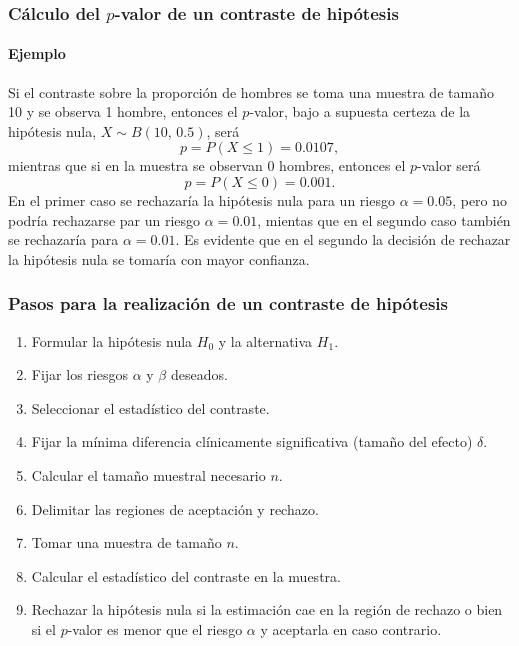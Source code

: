 \begin{frame}
\frametitle{Cálculo del $p$-valor de un contraste de hipótesis}
\framesubtitle{Ejemplo}
Si el contraste sobre la proporción de hombres se toma una muestra de tamaño 10 y se observa 1 hombre, entonces el $p$-valor, bajo a supuesta certeza de  la hipótesis nula, $X\sim B(10,\, 0.5)$, será
\[
p = P(X\leq 1)= 0.0107,
\]
mientras que si en la muestra se observan 0 hombres, entonces el $p$-valor será
\[
p = P(X\leq 0)= 0.001.
\]
En el primer caso se rechazaría la hipótesis nula para un riesgo $\alpha=0.05$, pero no podría rechazarse par un riesgo $\alpha=0.01$, mientas que en el segundo caso también se rechazaría para $\alpha=0.01$.
Es evidente que en el segundo la decisión de rechazar la hipótesis nula se tomaría con mayor confianza.
\end{frame}


\begin{frame}
\frametitle{Pasos para la realización de un contraste de hipótesis}
\begin{enumerate}
\item Formular la hipótesis nula $H_0$ y la alternativa $H_1$.
\item Fijar los riesgos $\alpha$ y $\beta$ deseados.
\item Seleccionar el estadístico del contraste.
\item Fijar la mínima diferencia clínicamente significativa (tamaño del efecto) $\delta$.
\item Calcular el tamaño muestral necesario $n$.
\item Delimitar las regiones de aceptación y rechazo.
\item Tomar una muestra de tamaño $n$.
\item Calcular el estadístico del contraste en la muestra.
\item Rechazar la hipótesis nula si la estimación cae en la región de rechazo o bien si el $p$-valor es menor que el
riesgo $\alpha$ y aceptarla en caso contrario.
\end{enumerate}
\end{frame}


